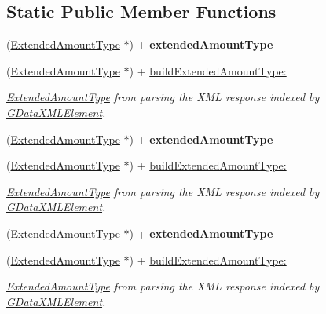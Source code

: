 \subsection*{Static Public Member Functions}
\begin{DoxyCompactItemize}
\item 
\hypertarget{interface_extended_amount_type_a797961e20215603c82ca30543741b09d}{
(\hyperlink{interface_extended_amount_type}{ExtendedAmountType} $\ast$) + {\bfseries extendedAmountType}}
\label{interface_extended_amount_type_a797961e20215603c82ca30543741b09d}

\item 
(\hyperlink{interface_extended_amount_type}{ExtendedAmountType} $\ast$) + \hyperlink{interface_extended_amount_type_ae691f7f2e118cf4cc20b107ca9720556}{buildExtendedAmountType:}
\begin{DoxyCompactList}\small\item\em \hyperlink{interface_extended_amount_type}{ExtendedAmountType} from parsing the XML response indexed by \hyperlink{interface_g_data_x_m_l_element}{GDataXMLElement}. \item\end{DoxyCompactList}\item 
\hypertarget{interface_extended_amount_type_a797961e20215603c82ca30543741b09d}{
(\hyperlink{interface_extended_amount_type}{ExtendedAmountType} $\ast$) + {\bfseries extendedAmountType}}
\label{interface_extended_amount_type_a797961e20215603c82ca30543741b09d}

\item 
(\hyperlink{interface_extended_amount_type}{ExtendedAmountType} $\ast$) + \hyperlink{interface_extended_amount_type_ae691f7f2e118cf4cc20b107ca9720556}{buildExtendedAmountType:}
\begin{DoxyCompactList}\small\item\em \hyperlink{interface_extended_amount_type}{ExtendedAmountType} from parsing the XML response indexed by \hyperlink{interface_g_data_x_m_l_element}{GDataXMLElement}. \item\end{DoxyCompactList}\item 
\hypertarget{interface_extended_amount_type_a797961e20215603c82ca30543741b09d}{
(\hyperlink{interface_extended_amount_type}{ExtendedAmountType} $\ast$) + {\bfseries extendedAmountType}}
\label{interface_extended_amount_type_a797961e20215603c82ca30543741b09d}

\item 
(\hyperlink{interface_extended_amount_type}{ExtendedAmountType} $\ast$) + \hyperlink{interface_extended_amount_type_ae691f7f2e118cf4cc20b107ca9720556}{buildExtendedAmountType:}
\begin{DoxyCompactList}\small\item\em \hyperlink{interface_extended_amount_type}{ExtendedAmountType} from parsing the XML response indexed by \hyperlink{interface_g_data_x_m_l_element}{GDataXMLElement}. \item\end{DoxyCompactList}\end{DoxyCompactItemize}

